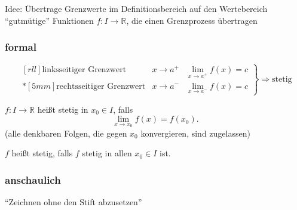 Idee: Übertrage Grenzwerte im Definitionsbereich auf den Wertebereich\\
"`gutmütige"' Funktionen $f: I \to \mathbb{R}$, die einen Grenzprozess übertragen

\subsubsection*{formal}
\begin{equation*}
  \left.
  \begin{matrix}[rll]
    \text{linksseitiger Grenzwert} & x \longrightarrow a^+ & \displaystyle\lim_{x \rightarrow a^+} f(x) = c \\*[5mm]
    \text{rechtsseitiger Grenzwert} & x \longrightarrow a^- & \displaystyle\lim_{x \rightarrow a^-} f(x) = c
  \end{matrix}
  \right\}\Rightarrow \text{stetig}
\end{equation*}

\begin{definition}[Stetigkeit]
  $f: I \to \mathbb{R}$ heißt stetig in $x_0 \in I$, falls \begin{equation*} \lim_{x\rightarrow x_0} f(x) = f(x_0). \end{equation*} (alle denkbaren Folgen, die gegen $x_0$ konvergieren, sind zugelassen)

  $f$ heißt stetig, falls $f$ stetig in allen $x_0 \in I$ ist.
\end{definition}

\subsubsection*{anschaulich}
"`Zeichnen ohne den Stift abzusetzen"'

\begin{center}

\end{center}

